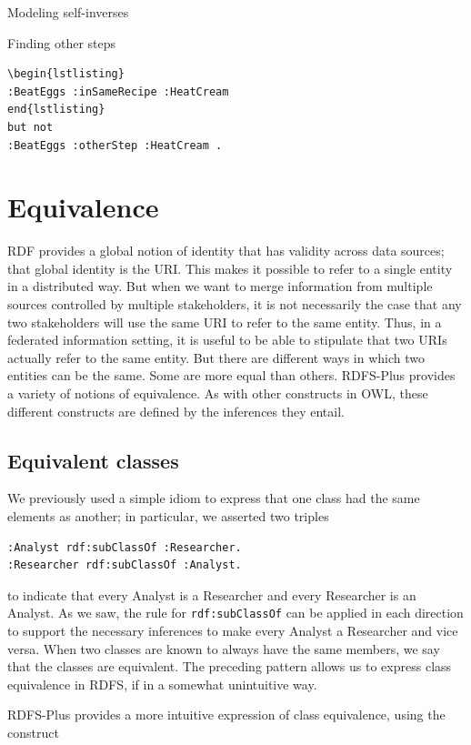\begin{challenge}{Modeling self-inverses}
\begin{challenge}{Finding other steps}
\begin{lstlisting}
\begin{lstlisting}
:BeatEggs :inSameRecipe :HeatCream
end{lstlisting}
but not
:BeatEggs :otherStep :HeatCream .
\end{lstlisting}
\end{challenge}

\section{Equivalence}
\label{section:Equivalence}
RDF provides a global notion of identity that has validity across data
sources; that global identity is the URI. This makes it possible to
refer to a single entity in a distributed way. But when we want to merge
information from multiple sources controlled by multiple stakeholders,
it is not necessarily the case that any two stakeholders will use the
same URI to refer to the same entity. Thus, in a federated information
setting, it is useful to be able to stipulate that two URIs actually
refer to the same entity. But there are different ways in which two
entities can be the same. Some are more equal than others. RDFS-Plus
provides a variety of notions of equivalence. As with other constructs
in OWL, these different constructs are defined by the inferences they
entail.

\subsection{Equivalent classes}

We previously used a simple idiom to express that one class had the same
elements as another; in particular, we asserted two triples

\begin{lstlisting}
:Analyst rdf:subClassOf :Researcher.
:Researcher rdf:subClassOf :Analyst.
\end{lstlisting}

to indicate that every Analyst is a Researcher and every Researcher is
an Analyst. As we saw, the rule for \texttt{rdf:subClassOf} can be applied in
each direction to support the necessary inferences to make every Analyst
a Researcher and vice versa. When two classes are known to always have
the same members, we say that the classes are equivalent. The preceding
pattern allows us to express class equivalence in RDFS, if in a somewhat
unintuitive way.

RDFS-Plus provides a more intuitive expression of class equivalence,
using the construct


\end{challenge}
